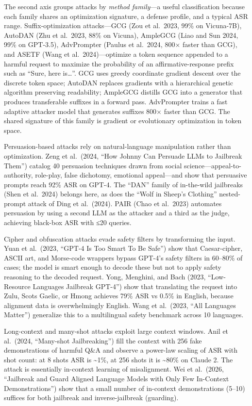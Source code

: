 \documentclass{article}
\begin{document}
The second axis groups attacks by \emph{method family}---a useful classification because each family shares an optimization signature, a defense profile, and a typical ASR range. Suffix-optimization attacks---GCG (Zou et al.~2023, 99\% on Vicuna-7B), AutoDAN (Zhu et al.~2023, 88\% on Vicuna), AmpleGCG (Liao and Sun 2024, 99\% on GPT-3.5), AdvPrompter (Paulus et al.~2024, 800× faster than GCG), and ASETF (Wang et al.~2024)---optimize a token sequence appended to a harmful request to maximize the probability of an affirmative-response prefix such as ``Sure, here is\ldots{}''. GCG uses greedy coordinate gradient descent over the discrete token space; AutoDAN replaces gradients with a hierarchical genetic algorithm preserving readability; AmpleGCG distills GCG into a generator that produces transferable suffixes in a forward pass. AdvPrompter trains a fast adaptive attacker model that generates suffixes 800× faster than GCG. The shared signature of this family is gradient or evolutionary optimization in token space.

Persuasion-based attacks rely on natural-language manipulation rather than optimization. Zeng et al.~(2024, ``How Johnny Can Persuade LLMs to Jailbreak Them'') catalog 40 persuasion techniques drawn from social science---appeal-to-authority, role-play, false dichotomy, emotional appeal---and show that persuasive prompts reach 92\% ASR on GPT-4. The ``DAN'' family of in-the-wild jailbreaks (Shen et al.~2024) belongs here, as does the ``Wolf in Sheep's Clothing'' nested-prompt attack of Ding et al.~(2024). PAIR (Chao et al.~2023) automates persuasion by using a second LLM as the attacker and a third as the judge, achieving black-box ASR with ≤20 queries.

Cipher and obfuscation attacks evade safety filters by transforming the input. Yuan et al.~(2023, ``GPT-4 Is Too Smart To Be Safe'') show that Caesar-cipher, ASCII art, and Morse-code wrappers bypass GPT-4's safety filters in 60--80\% of cases; the model is smart enough to decode these but not to apply safety reasoning to the decoded request. Yong, Menghini, and Bach (2023, ``Low-Resource Languages Jailbreak GPT-4'') show that translating the request into Zulu, Scots Gaelic, or Hmong achieves 79\% ASR vs 0.5\% in English, because alignment data is overwhelmingly English. Wang et al.~(2023, ``All Languages Matter'') generalize this to a multilingual safety benchmark across 10 languages.

Long-context and many-shot attacks exploit large context windows. Anil et al.~(2024, ``Many-shot Jailbreaking'') fill the context with 256 fake demonstrations of harmful Q\&A and observe a power-law scaling of ASR with shot count: at 8 shots ASR is \textasciitilde1\%, at 256 shots it is \textasciitilde80\% on Claude 2. The attack is essentially in-context learning of misalignment. Wei et al.~(2026, ``Jailbreak and Guard Aligned Language Models with Only Few In-Context Demonstrations'') show that a small number of in-context demonstrations (5--10) suffices for both jailbreak and inverse-jailbreak (guarding).
\end{document}
